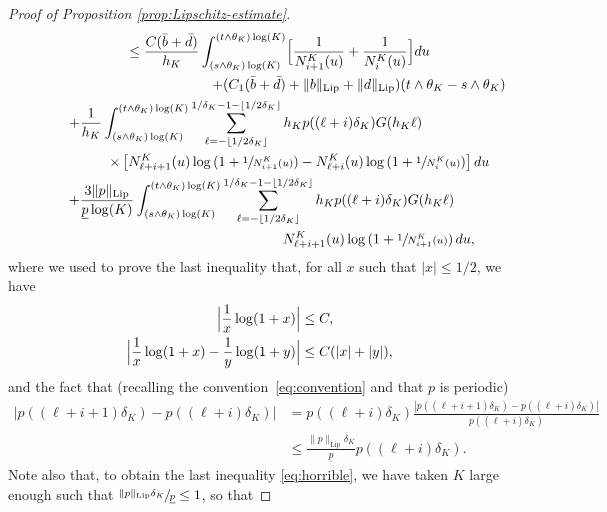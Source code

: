 \documentclass[JEP,XML,SOM,Unicode,published]{cedram}
\theoremstyle{plain}
\theoremstyle{remark}
\begin{document}
\begin{proof}[Proof of Proposition \ref{prop:Lipschitz-estimate}]
\begin{multline*}
\hspace*{1cm} \leq \frac{C(\bar b+\bar d)}{ h_K}\int_{(s\wedge\theta_K)\log(K)}^{(t\wedge\theta_K)\log(K)}\Bigl[\frac{1}{N^K_{i+1}(u)}+\frac{1}{N^K_{i}(u)}\Bigr]du \\
 \hspace{5cm} +(C_1(\bar b+\bar d)+\|b\|_{\text{Lip}}+\|d\|_{\text{Lip}})(t\wedge \theta_K-s\wedge \theta_K)  \\
\hspace*{-.7cm} +\frac{1}{h_K}\int_{(s\wedge\theta_K)\log(K)}^{(t\wedge\theta_K)\log(K)} \sum_{\ell=-\lfloor 1/2\delta_K\rfloor}^{1/\delta_K-1-\lfloor 1/2\delta_K\rfloor} h_{K} p((\ell+i)\delta_K) G(h_{K}\ell)\\
 \hspace{2cm}\times \left[N_{\ell+i+1}^K(u)\log \left(1+\sfrac{1}{N_{i+1}^K(u)}\right)-N_{\ell+i}^K(u)\log \left(1+\sfrac{1}{N_{i}^K(u)}\right)
\right]du  \\
\hspace*{.1cm} +\frac{3\|p\|_{\text{Lip}}}{\underline{p}\log(K)}\int_{(s\wedge\theta_K)\log(K)}^{(t\wedge\theta_K)\log(K)} \sum_{\ell=-\lfloor 1/2\delta_K\rfloor}^{1/\delta_K-1-\lfloor 1/2\delta_K\rfloor}h_Kp((\ell+i)\delta_K)G(h_K\ell)\\
 \hspace{6cm}N_{\ell+i+1}^K(u)\log \left(1+\sfrac{1}{N_{i+1}^K(u)}\right)du,
\end{multline*}
where we used to prove the last inequality that, for all $x$ such that $|x|\leq 1/2$, we have\vspace*{-3pt}
\begin{align}
\Bigl|\frac{1}{x}\log(1+x)\Bigr|&\leq C,
\label{approxlog3}\\
\Bigl |\frac{1}{x}\log(1+x)-\frac{1}{y}\log(1+y) \Bigr|&\leq C(|x|+|y|),
\label{approxlog4}
\end{align}
and the fact that (recalling the convention~\eqref{eq:convention} and that $p$ is periodic)\vspace*{-3pt}
\begin{align*}%
\left|p((\ell+i+1)\delta_K)-p((\ell+i)\delta_K)\right|&= p((\ell+i)\delta_K)\frac{\left|p((\ell+i+1)\delta_K)-p((\ell+i)\delta_K)\right|}{p((\ell+i)\delta_K)} \\
&\leq\frac{\|p\|_{\text{Lip}}\delta_K}{\underline{p}}p((\ell+i)\delta_K).
\end{align*}
Note also that, to obtain the last inequality \eqref{eq:horrible}, we have taken $K$ large enough such that $\sfrac{\|p\|_{\text{Lip}}\delta_K}{\underline{p}}\leq 1$, so that\vspace*{-3pt}

\end{proof}
\end{document}
